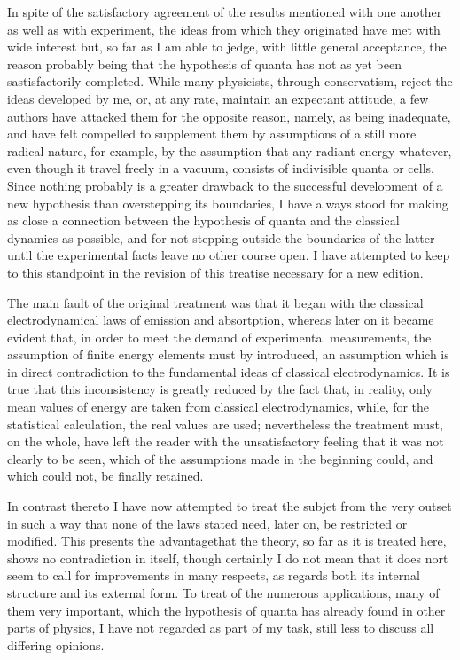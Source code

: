 \documentclass[12pt,oneside]{book}
\begin{document}
In spite of the satisfactory agreement of the results mentioned with one another as well as with experiment, the ideas from which they originated have met with wide interest but, so far as I am able to jedge, with little general acceptance, the reason probably being that the hypothesis of quanta has not as yet been sastisfactorily completed. While many physicists, through conservatism, reject the ideas developed by me, or, at any rate, maintain an expectant attitude, a few authors have attacked them for the opposite reason, namely, as being inadequate, and have felt compelled to supplement them by assumptions of a still more radical nature, for example, by the assumption that any radiant energy whatever, even though it travel freely in a vacuum, consists of indivisible quanta or cells. Since nothing probably is a greater drawback to the successful development of a new hypothesis than overstepping its boundaries, I have always stood for making as close a connection between the hypothesis of quanta and the classical dynamics as possible, and for not stepping outside the boundaries of the latter until the experimental facts leave no other course open. I have attempted to keep to this standpoint in the revision of this treatise necessary for a new edition. \par 

The main fault of the original treatment was that it began with the classical electrodynamical laws of emission and absortption, whereas later on it became evident that, in order to meet the demand of experimental measurements, the assumption of finite energy elements must by introduced, an assumption which is in direct contradiction to the fundamental ideas of classical electrodynamics. It is true that this inconsistency is greatly reduced by the fact that, in reality, only mean values of energy are taken from classical electrodynamics, while, for the statistical calculation, the real values are used; nevertheless the treatment must, on the whole, have left the reader with the unsatisfactory feeling that it was not clearly to be seen, which of the assumptions made in the beginning could, and which could not, be finally retained. \par 

In contrast thereto I have now attempted to treat the subjet from the very outset in such a way that none of the laws stated need, later on, be restricted or modified. This presents the advantagethat the theory, so far as it is treated here, shows no contradiction in itself, though certainly I do not mean that it does nort seem to call for improvements in many respects, as regards both its internal structure and its external form. To treat of the numerous applications, many of them very important, which the hypothesis of quanta has already found in other parts of physics, I have not regarded as part of my task, still less to discuss all differing opinions. \par 
\end{document}
